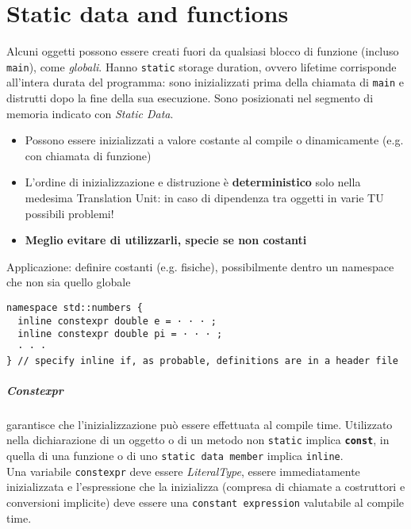 \documentclass[10pt, oneside]{Book}
\begin{document}
\chapter{Static data and functions}
Alcuni oggetti possono essere creati fuori da qualsiasi blocco di funzione (incluso \texttt{main}), come \textit{globali}. Hanno \texttt{static} storage duration, ovvero lifetime corrisponde all'intera durata del programma: sono inizializzati prima della chiamata di \texttt{main} e distrutti dopo la fine della sua esecuzione. Sono posizionati nel segmento di memoria indicato con \textit{Static Data}.
\begin{itemize}
\item Possono essere inizializzati a valore costante al compile o dinamicamente (e.g. con chiamata di funzione)
\item L'ordine di inizializzazione e distruzione è \textbf{deterministico} solo nella medesima Translation Unit: in caso di dipendenza tra oggetti in varie TU possibili problemi!
\item \textbf{Meglio evitare di utilizzarli, specie se non costanti}
\end{itemize}
Applicazione: definire costanti (e.g. fisiche), possibilmente dentro un namespace che non sia quello globale
\begin{verbatim}
namespace std::numbers {
  inline constexpr double e = · · · ;
  inline constexpr double pi = · · · ;
  · · ·
} // specify inline if, as probable, definitions are in a header file
\end{verbatim}
\paragraph{Constexpr} garantisce che l'inizializzazione può essere effettuata al compile time. Utilizzato nella dichiarazione di un oggetto o di un metodo non \texttt{static} implica \textbf{\texttt{const}}, in quella di una funzione o di uno \texttt{static data member} implica \texttt{inline}. 
\\Una variabile \texttt{constexpr} deve essere \textit{LiteralType}, essere immediatamente inizializzata e l'espressione che la inizializza (compresa di chiamate a costruttori e conversioni implicite) deve essere una \texttt{constant expression} valutabile al compile time.
\end{document}
